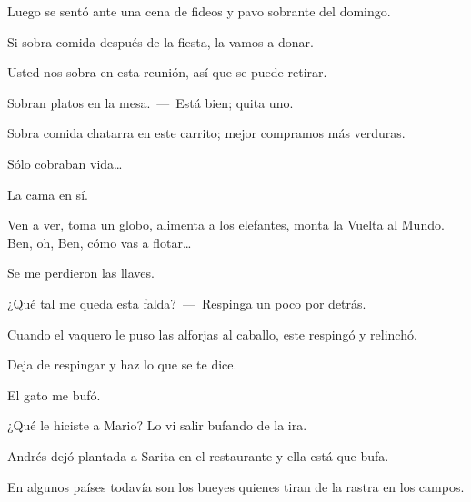 \sk
Luego se sentó ante una cena de fideos y pavo sobrante del domingo.

\sk
Si sobra comida después de la fiesta, la vamos a donar.

\sk
Usted nos sobra en esta reunión, así que se puede retirar.

\sk
Sobran platos en la mesa.~---~Está bien; quita uno.

\sk
Sobra comida chatarra en este carrito; mejor compramos más verduras.

\sk
Sólo cobraban vida\ldots{}

\sk
La cama en sí. 

\sk
Ven a ver, toma un globo,
alimenta a los elefantes, monta la Vuelta al
Mundo. Ben, oh, Ben, cómo vas a flotar\ldots{}

\sk
Se me perdieron las llaves.

\sk
¿Qué tal me queda esta falda?~---~Respinga un poco por detrás.

\sk
Cuando el vaquero le puso las alforjas al caballo, este respingó y relinchó.

\sk
Deja de respingar y haz lo que se te dice.

\sk
El gato me bufó. 

\sk
¿Qué le hiciste a Mario? Lo vi salir bufando de la ira.

\sk
Andrés dejó plantada a Sarita en el restaurante y ella está que bufa.

\sk
En algunos países todavía son los bueyes quienes tiran de la rastra en los campos.

